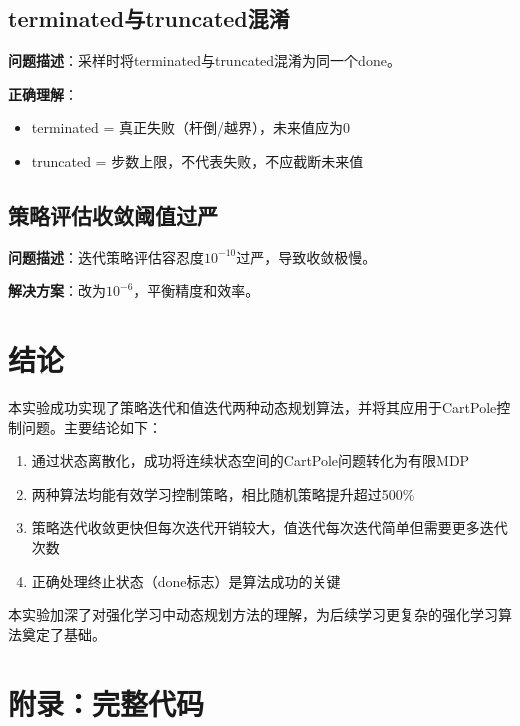 \documentclass[12pt,a4paper]{article}
\begin{document}
\subsection{terminated与truncated混淆}

\textbf{问题描述}：采样时将terminated与truncated混淆为同一个done。

\textbf{正确理解}：
\begin{itemize}[itemsep=0pt]
    \item terminated = 真正失败（杆倒/越界），未来值应为0
    \item truncated = 步数上限，不代表失败，不应截断未来值
\end{itemize}

\subsection{策略评估收敛阈值过严}

\textbf{问题描述}：迭代策略评估容忍度$10^{-10}$过严，导致收敛极慢。

\textbf{解决方案}：改为$10^{-6}$，平衡精度和效率。

\section{结论}

本实验成功实现了策略迭代和值迭代两种动态规划算法，并将其应用于CartPole控制问题。主要结论如下：

\begin{enumerate}[itemsep=0pt]
    \item 通过状态离散化，成功将连续状态空间的CartPole问题转化为有限MDP
    \item 两种算法均能有效学习控制策略，相比随机策略提升超过500\%
    \item 策略迭代收敛更快但每次迭代开销较大，值迭代每次迭代简单但需要更多迭代次数
    \item 正确处理终止状态（done标志）是算法成功的关键
\end{enumerate}

本实验加深了对强化学习中动态规划方法的理解，为后续学习更复杂的强化学习算法奠定了基础。

\newpage

\section*{附录：完整代码}
\end{document}
